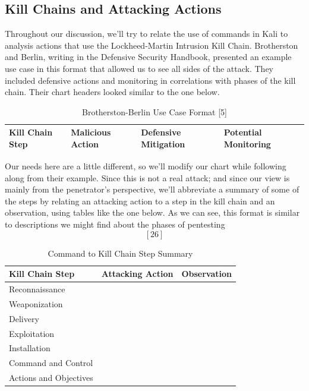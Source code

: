 \subsection{Kill Chains and Attacking Actions}
Throughout our discussion, we'll try to relate the use of commands in Kali to analysis actions that use the Lockheed-Martin Intrusion Kill Chain.  Brotherston and Berlin, writing in the Defensive Security Handbook, presented an example use case in this format that allowed us to see all sides of the \gls{attack}. \endnote{[5]} They included defensive actions and monitoring in correlations with phases of the kill chain.  Their chart headers looked similar to the one below.

\begin{table}[H]
\caption{Brotherston-Berlin Use Case Format [5]}
\centering
\begin{tabular}{|l|l|l|l|}
\hline
Kill Chain Step & Malicious Action & Defensive Mitigation & Potential Monitoring \\
\hline
\hline
\end{tabular}
\end{table}

Our needs here are a little different, so we'll modify our chart while following along from their example.  Since this is not a real attack; and since our view is mainly from the penetrator's perspective, we'll abbreviate a summary of some of the steps by relating an attacking action to a step in the kill chain and an observation, using tables like the one below.  As we can see, this format is similar to descriptions we might find about the phases of pentesting \[[26]\]

\begin{table}[H]
\caption{Command to Kill Chain Step Summary}
\centering
\begin{tabular}{|l|l|l|}
\hline
Kill Chain Step & Attacking Action & Observation \\
\hline
Reconnaissance &  &  \\
Weaponization &  &  \\
Delivery &  &  \\
Exploitation &  &  \\
Installation &  &  \\
Command and Control &  &  \\
Actions and Objectives &  &  \\
\hline
\end{tabular}
\end{table}


